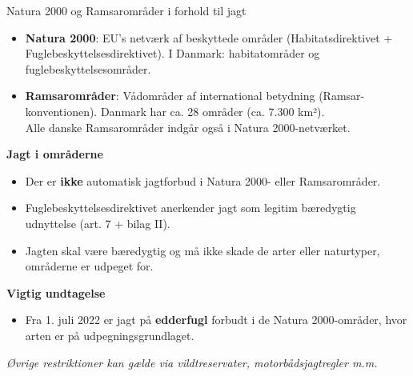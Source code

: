 \begin{frame}{Natura 2000 og Ramsarområder i forhold til jagt}

\begin{itemize}
  \item \textbf{Natura 2000}: EU’s netværk af beskyttede områder (Habitatsdirektivet + Fuglebeskyttelsesdirektivet). I Danmark: habitatområder og fuglebeskyttelsesområder.
  \item \textbf{Ramsarområder}: Vådområder af international betydning (Ramsar-konventionen). Danmark har ca. 28 områder (ca. 7.300 km²).\\
        Alle danske Ramsarområder indgår også i Natura 2000-netværket.
\end{itemize}

\vspace{0.4cm}

\textbf{Jagt i områderne}
\begin{itemize}
  \item Der er \textbf{ikke} automatisk jagtforbud i Natura 2000- eller Ramsarområder.
  \item Fuglebeskyttelsesdirektivet anerkender jagt som legitim bæredygtig udnyttelse (art. 7 + bilag II).
  \item Jagten skal være bæredygtig og må ikke skade de arter eller naturtyper, områderne er udpeget for.
\end{itemize}

\vspace{0.3cm}

\textbf{Vigtig undtagelse}
\begin{itemize}
  \item Fra 1. juli 2022 er jagt på \textbf{edderfugl} forbudt i de Natura 2000-områder, hvor arten er på udpegningsgrundlaget.
\end{itemize}

\vspace{0.3cm}
\footnotesize
\textit{Øvrige restriktioner kan gælde via vildtreservater, motorbådsjagtregler m.m.}

\end{frame}